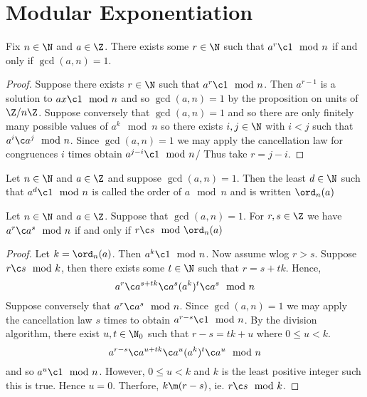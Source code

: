 

\section{Modular Exponentiation}

\begin{nprop}
 Fix $n \in \N$ and $a \in \Z$. There exists some $r \in \N$ such that $a^r \c 1 \mod n$ if and only if $\gcd(a, n) = 1$.
\end{nprop}

\begin{proof}
  Suppose there exists $r \in \N$ such that $a^r \c 1 \mod n$. Then $a^{r-1}$ is a solution to $ax \c 1 \mod n$ and so $\gcd(a, n) = 1$ by the proposition on units of $\Z/n\Z$. Suppose conversely that $\gcd(a, n) = 1$ and so there are only finitely many possible values of $a^k \mod n$ so there exists $i, j \in \N$ with $i < j$ such that $a^i \c a^j\mod n$. Since $\gcd(a, n) = 1$ we may apply the cancellation law for congruences $i$ times obtain $a^{j-i}\c 1\mod n$/ Thus take $r = j-i$.
\end{proof}

\begin{ndefi}[Order]
  Let $n \in \N$ and $a \in \Z$ and suppose $\gcd(a, n) = 1$. Then the least $d \in \N$ such that $a^d \c 1 \mod n$ is called the order of $a\mod n$ and is written $\ord_n(a)$
\end{ndefi}

\begin{nprop}
   Let $n \in \N$ and $a\in \Z$. Suppose that $\gcd(a, n) = 1$. For $r, s \in \Z$ we have $a^r \c a^s \mod n$ if and only if $r \c s \mod \ord_n(a)$
\end{nprop}
\begin{proof}
  Let $k =\ord_n(a)$. Then $a^k \c 1 \mod n$. Now assume wlog $r > s$. Suppose $r \c s \mod k$, then there exists some $t \in \N$ such that $r = s + tk$. Hence,
  $$ a^r \c a^{s + tk} \c a^s(a^k)^t \c a^s \mod n $$
  Suppose conversely that $a^r \c a^s \mod n$. Since $\gcd(a, n)= 1$ we may apply the cancellation law $s$ times to obtain $a^{r - s}\c 1 \mod n$. By the division algorithm, there exist $u, t \in \N_0$ such that $r - s = tk + u$ where $0 \le u < k$.\\
  $$ a^{r-s} \c a^{u+tk} \c a^u(a^k)^t \c a^u\mod n $$
  and so $a^u\c 1 \mod n$. However, $0 \le u  < k$ and $k$ is the least positive integer such this is true. Hence $u = 0$. Therfore, $k \m (r - s)$, ie. $r \c s \mod k$.
\end{proof}

